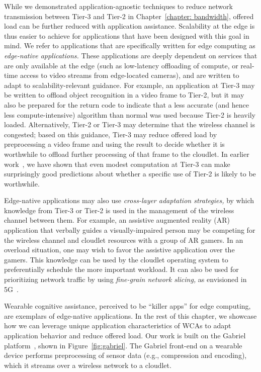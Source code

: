 While we demonstrated application-agnostic techniques to reduce network
transmission between Tier-3 and Tier-2 in Chapter~\ref{chapter: bandwidth},
offered load can be further reduced with application assistance. Scalability at
the edge is thus easier to achieve for applications that have been designed with
this goal in mind.  We refer to applications that are specifically written for
edge computing as {\em edge-native applications.}  These applications are deeply
dependent on services that are only available at the edge (such as low-latency
offloading of compute, or real-time access to video streams from edge-located
cameras), and are written to adapt to scalability-relevant guidance.  For
example, an application at Tier-3 may be written to offload object recognition
in a video frame to Tier-2, but it may also be prepared for the return code to
indicate that a less accurate (and hence less compute-intensive) algorithm than
normal was used because Tier-2 is heavily loaded.  Alternatively, Tier-2 or
Tier-3 may determine that the wireless channel is congested; based on this
guidance, Tier-3 may reduce offered load by preprocessing a video frame and
using the result to decide whether it is worthwhile to offload further
processing of that frame to the cloudlet.  In earlier work~\cite{Hu2015}, we
have shown that even modest computation at Tier-3 can make surprisingly good
predictions about whether a specific use of Tier-2 is likely to be worthwhile.

Edge-native applications may also use {\em cross-layer adaptation
  strategies,} by which knowledge from Tier-3 or Tier-2 is used in the
management of the wireless channel between them.  For example, an
assistive augmented reality (AR) application that verbally guides a
visually-impaired person may be competing for the wireless channel and
cloudlet resources with a group of AR gamers.  In an overload
situation, one may wish to favor the assistive application over the
gamers.  This knowledge can be used by the cloudlet operating system
to preferentially schedule the more important workload.  It can also
be used for prioritizing network traffic by using {\em fine-grain
  network slicing,} as envisioned in 5G~\cite{Contreras2018}.

Wearable cognitive assistance, perceived to be ``killer apps'' for edge
computing, are exemplars of edge-native applications. In the rest of this
chapter, we showcase how we can leverage unique application characteristics of
WCAs to adapt application behavior and reduce offered load. Our work is built on
the Gabriel platform~\cite{ha2014towards,chen2017empirical}, shown in
Figure~\ref{fig:gabriel}. The Gabriel front-end on a wearable device performs
preprocessing of sensor data (e.g., compression and encoding), which it streams
over a wireless network to a cloudlet.  

